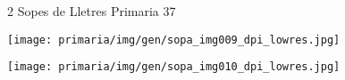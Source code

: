 %
%
\begin{news}
{2} %
{Sopes de Lletres}
{}
{Primaria}
{37} %


\noindent\texttt{[image: primaria/img/gen/sopa\_img009\_dpi\_lowres.jpg]}

\noindent\texttt{[image: primaria/img/gen/sopa\_img010\_dpi\_lowres.jpg]}
  
\end{news}
